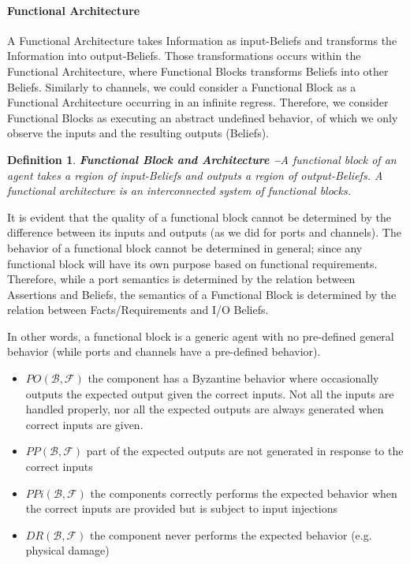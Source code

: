 \documentclass[conference]{IEEEtran}
\newcommand{\beliefRegion}{\mathcal{B}}
\newcommand{\factRegion}{\mathcal{F}}
\newcommand{\pp}[2]{PP(#1,#2)}
\newcommand{\po}[2]{PO(#1,#2)}
\newcommand{\ppi}[2]{PPi(#1,#2)}
\newcommand{\dr}[2]{DR(#1,#2)}
\newtheorem{definition}{Definition}%
\begin{document}
\paragraph{Functional Architecture}
A Functional Architecture takes Information as input-Beliefs and transforms the
Information into output-Beliefs. Those transformations occurs within the
Functional Architecture, where Functional Blocks transforms Beliefs into other
Beliefs. Similarly to channels, we could consider a Functional Block as a
Functional Architecture occurring in an infinite regress. Therefore, we
consider Functional Blocks as executing an abstract undefined behavior, of
which we only observe the inputs and the resulting outputs (Beliefs).

\begin{definition}{\bf Functional Block and Architecture --}\label{def:funblock}
	A functional block of an agent 
	takes a region of input-Beliefs and outputs a region of output-Beliefs. 
	A functional architecture is an interconnected system of functional blocks.
\end{definition}
It is evident that the quality of a functional block cannot be determined
by the difference between its inputs and outputs (as we did for
ports and channels). The behavior of a functional block
cannot be determined in general; since any functional block will have 
its own purpose based on functional requirements. 
Therefore, while a port semantics is determined by the relation 
between Assertions and Beliefs, the semantics of a Functional Block 
is determined by the relation between Facts/Requirements and I/O Beliefs.

In other words, a functional block is a generic agent with no pre-defined general
behavior (while ports and channels have a pre-defined behavior).

\begin{itemize}
	\item $\po{\beliefRegion}{\factRegion}$ the component has a Byzantine behavior where occasionally outputs the expected
	        output given the correct inputs. Not all the inputs are handled
	        properly, nor all the expected outputs are always generated
	        when correct inputs are given.
	\item $\pp{\beliefRegion}{\factRegion}$ part of the expected outputs are not
	        generated in response to the correct
	        inputs
	\item $\ppi{\beliefRegion}{\factRegion}$ the components
	        correctly performs the expected behavior when the correct
	        inputs are provided but is subject to input
	        injections
	\item $\dr{\beliefRegion}{\factRegion}$ the component
		never performs the expected behavior (e.g. physical
		damage)
\end{itemize}
\end{document}
